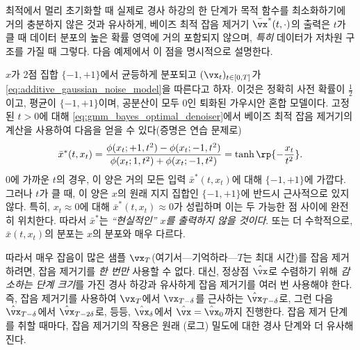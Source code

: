 \documentclass[../../book-main_ko.tex]{subfiles}
\begin{document}
최적에서 멀리 초기화할 때 실제로 경사 하강의 한 단계가 목적 함수를 최소화하기에 거의 충분하지 않은 것과 유사하게, 베이즈 최적 잡음 제거기 \(\bar{\vx}^{\ast}(t, \cdot)\)의 출력은 \(t\)가 클 때 데이터 분포의 높은 확률 영역에 거의 포함되지 않으며, \textit{특히} 데이터가 저차원 구조를 가질 때 그렇다. 다음 예제에서 이 점을 명시적으로 설명한다.
\begin{example}[2점 혼합의 잡음 제거]\label{example:denoising_twopoints}
	\(x\)가 2점 집합 \(\{-1, +1\}\)에서 균등하게 분포되고 \((\vx_{t})_{t \in [0, T]}\)가 \eqref{eq:additive_gaussian_noise_model}을 따른다고 하자. 이것은 정확히 사전 확률이 \(\frac{1}{2}\)이고, 평균이 \(\{-1, +1\}\)이며, 공분산이 모두 \(0\)인 퇴화된 가우시안 혼합 모델이다. 고정된 \(t > 0\)에 대해 \eqref{eq:gmm_bayes_optimal_denoiser}에서 베이즈 최적 잡음 제거기의 계산을 사용하여 다음을 얻을 수 있다(증명은 연습 문제로)
	\begin{equation}
		\bar{x}^{\ast}(t, x_{t}) = \frac{\phi(x_{t} ; +1, t^{2}) - \phi(x_{t}
		; -1, t^{2})}{\phi(x_{t} ; 1, t^{2}) + \phi(x_{t} ; -1, t^{2})} = \tanh\rp{-\frac{x_{t}}{t^{2}}}.
	\end{equation}
	\(0\)에 가까운 \(t\)의 경우, 이 양은 거의 모든 입력 \(\bar{x}^{\ast}(t, x_{t})\)에 대해 \(\{-1, +1\}\)에 가깝다. 그러나 \(t\)가 클 때, 이 양은 \(x\)의 원래 지지 집합인 \(\{-1, +1\}\)에 반드시 근사적으로 있지 않다. 특히, \(x_{t} \approx 0\)에 대해 \(\bar{x}^{\ast}(t, x_{t}) \approx 0\)가 성립하며 이는 두 가능한 점 사이에 완전히 위치한다. 따라서 \(\bar{x}^{\ast}\)는 \textit{``현실적인'' \(x\)를 출력하지 않을 것이다}. 또는 더 수학적으로, \(\bar{x}(t, x_{t})\)의 분포는 \(x\)의 분포와 매우 다르다.
\end{example}

따라서 매우 잡음이 많은 샘플 \(\vx_{T}\)(여기서—기억하라—\(T\)는 최대 시간)를 잡음 제거하려면, 잡음 제거기를 \textit{한 번만} 사용할 수 없다. 대신, 정상점 \(\hat{\vx}\)로 수렴하기 위해 \textit{감소하는 단계 크기}를 가진 경사 하강과 유사하게 잡음 제거기를 여러 번 사용해야 한다. 즉, 잡음 제거기를 사용하여 \(\vx_{T}\)에서 \(\vx_{T - \delta}\)를 근사하는 \(\hat{\vx}_{T - \delta}\)로, 그런 다음 \(\hat{\vx}_{T - \delta}\)에서 \(\hat{\vx}_{T - 2\delta}\)로, 등등, \(\hat{\vx}_{\delta}\)에서 \(\hat{\vx} = \hat{\vx}_{0}\)까지 진행한다. 잡음 제거 단계를 취할 때마다, 잡음 제거기의 작용은 원래 (로그) 밀도에 대한 경사 단계와 더 유사해진다.
\end{document}
